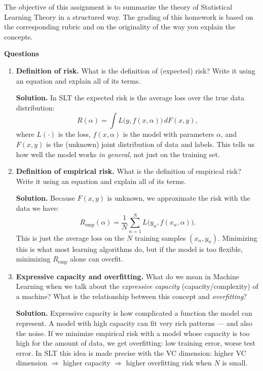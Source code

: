 \documentclass[11pt]{article}
\begin{document}
	\setlength{\parindent}{0pt}
	
	The objective of this assignment is to summarize the theory of Statistical Learning Theory in a structured way. The grading of this homework is based on the corresponding rubric and on the originality of the way you explain the concepts.
	
	\medskip
	\textbf{Questions}
	
	\begin{enumerate}
		\item \textbf{Definition of risk.} What is the definition of (expected) risk? Write it using an equation and explain all of its terms.
		
		\noindent\textbf{Solution.}
		In SLT the expected risk is the average loss over the true data distribution:
		\[
		R(\alpha) = \int L\big(y, f(x,\alpha)\big)\, dF(x,y),
		\]
		where $L(\cdot)$ is the loss, $f(x,\alpha)$ is the model with parameters $\alpha$, and $F(x,y)$ is the (unknown) joint distribution of data and labels. This tells us how well the model works \emph{in general}, not just on the training set.
		
		\vspace{1em}
		
		\item \textbf{Definition of empirical risk.} What is the definition of empirical risk? Write it using an equation and explain all of its terms.
		
		\noindent\textbf{Solution.}
		Because $F(x,y)$ is unknown, we approximate the risk with the data we have:
		\[
		R_{\text{emp}}(\alpha) = \frac{1}{N} \sum_{n=1}^{N} L\big(y_n, f(x_n,\alpha)\big).
		\]
		This is just the average loss on the $N$ training samples $(x_n, y_n)$. Minimizing this is what most learning algorithms do, but if the model is too flexible, minimizing $R_{\text{emp}}$ alone can overfit.
		
		\vspace{1em}
		
		\item \textbf{Expressive capacity and overfitting.} What do we mean in Machine Learning when we talk about the \emph{expressive capacity} (capacity/complexity) of a machine? What is the relationship between this concept and \emph{overfitting}?
		
		\noindent\textbf{Solution.}
		Expressive capacity is how complicated a function the model can represent. A model with high capacity can fit very rich patterns — and also the noise. If we minimize empirical risk with a model whose capacity is too high for the amount of data, we get overfitting: low training error, worse test error. In SLT this idea is made precise with the VC dimension: higher VC dimension $\Rightarrow$ higher capacity $\Rightarrow$ higher overfitting risk when $N$ is small.
		

\end{enumerate}
\end{document}
